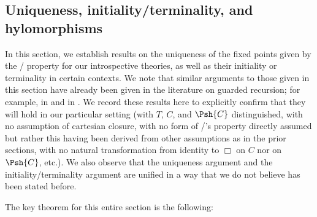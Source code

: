 \subsection{Uniqueness, initiality/terminality, and hylomorphisms}\label{LoebPropertyReduxSection}
In this section, we establish results on the uniqueness of the fixed points given by the \Loeb/ property for our introspective theories, as well as their initiality or terminality in certain contexts. We note that similar arguments to those given in this section have already been given in the literature on guarded recursion; for example, in \autocite{birkedal2011first} and in \autocite{birkedal2013universes}. We record these results here to explicitly confirm that they will hold in our particular setting (with $T$, $C$, and $\Psh{C}$ distinguished, with no assumption of cartesian closure, with no form of \Loeb/'s property directly assumed but rather this having been derived from other assumptions as in the prior sections, with no natural transformation from identity to $\Box$ on $C$ nor on $\Psh{C}$, etc.). We also observe that the uniqueness argument and the initiality/terminality argument are unified in a way that we do not believe has been stated before.

The key theorem for this entire section is the following:


